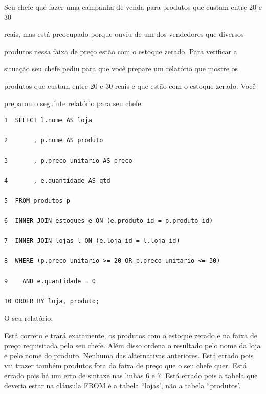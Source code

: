 \documentclass[12pt, addpoints]{exam}
\begin{document}
\begin{questions}
\question

Seu chefe que fazer uma campanha de venda para produtos que custam entre 20 e 30

reais, mas está preocupado porque ouviu de um dos vendedores que diversos

produtos nessa faixa de preço estão com o estoque zerado. Para verificar a

situação seu chefe pediu para que você prepare um relatório que mostre os

produtos que custam entre 20 e 30 reais e que estão com o estoque zerado. Você

preparou o seguinte relatório para seu chefe:

\begin{tcolorbox}

 \begin{verbatim}1  SELECT l.nome AS loja

2       , p.nome AS produto

3       , p.preco_unitario AS preco

4       , e.quantidade AS qtd

5  FROM produtos p

6  INNER JOIN estoques e ON (e.produto_id = p.produto_id)

7  INNER JOIN lojas l ON (e.loja_id = l.loja_id)

8  WHERE (p.preco_unitario >= 20 OR p.preco_unitario <= 30)

9    AND e.quantidade = 0

10 ORDER BY loja, produto;

 \end{verbatim}

\end{tcolorbox}

O seu relatório:
\begin{choices}
\choice Está correto e trará exatamente, os produtos com o estoque zerado e na faixa de preço requisitada pelo seu chefe. Além disso ordena o resultado pelo nome da loja e pelo nome do produto.
\choice Nenhuma das alternativas anteriores.
\choice Está errado pois vai trazer também produtos fora da faixa de preço que o seu chefe quer.
\choice Está errado pois há um erro de sintaxe nas linhas 6 e 7.
\choice Está errado pois a tabela que deveria estar na cláusula FROM é a tabela ``lojas', não a tabela ``produtos'.
\end{choices}



    \end{questions}
    
\end{document}
